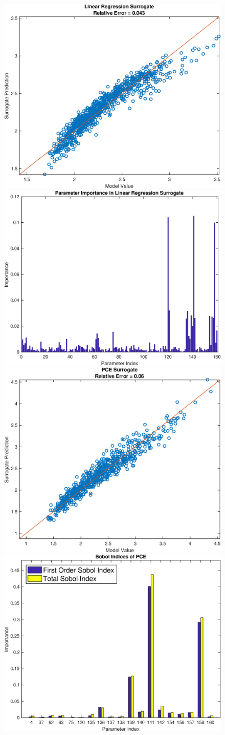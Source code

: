 \documentclass[12pt]{article}
\numberwithin{equation}{section}
\begin{document}
\begin{figure}[h]
\centering
\includegraphics[width=.49 \textwidth]{Figures/Vol_Flow_QoI_LR_Prediction_Rectangular.eps}
\includegraphics[width=.49 \textwidth]{Figures/Vol_Flow_QoI_LR_VI_Rectangular.eps}\\
\includegraphics[width=.49 \textwidth]{Figures/Vol_Flow_QoI_PCE_Prediction_Rectangular.eps}
\includegraphics[width=.49 \textwidth]{Figures/Vol_Flow_QoI_PCE_SI_Rectangular.eps}
\end{figure}
\end{document}
